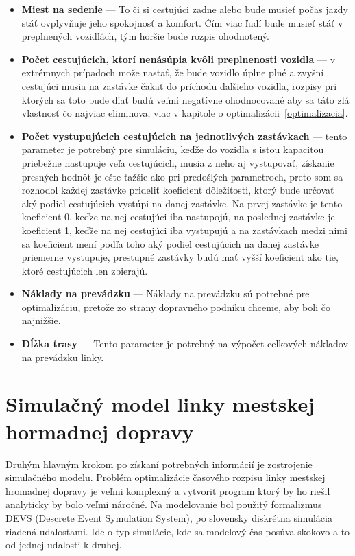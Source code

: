 \begin{itemize}
  \item \textbf{Miest na sedenie} --- To či si cestujúci zadne alebo bude musieť počas jazdy stáť ovplyvňuje jeho spokojnosť a komfort. Čím viac ľudí bude musieť stáť v preplnených vozidlách, tým horšie bude rozpis ohodnotený.
  \item \textbf{Počet cestujúcich, ktorí nenásúpia kvôli preplnenosti vozidla} --- v extrémnych prípadoch može nastať, že bude vozidlo úplne plné a zvyšní cestujúci musia na zastávke čakať do príchodu ďalšieho vozidla, rozpisy pri ktorých sa toto bude diať budú veľmi negatívne ohodnocované aby sa táto zlá vlastnosť čo najviac eliminova, viac v kapitole o optimalizácii~\ref{optimalizacia}.
  \item \textbf{Počet vystupujúcich cestujúcich na jednotlivých zastávkach} --- tento parameter je potrebný pre simuláciu, keďže do vozidla s istou kapacitou priebežne nastupuje veľa cestujúcich, musia z neho aj vystupovať, získanie presných hodnôt je ešte ťažšie ako pri predošlých parametroch, preto som sa rozhodol každej zastávke prideliť koeficient dôležitosti, ktorý bude určovať aký podiel cestujúcich vystúpi na danej zastávke. Na prvej zastávke je tento koeficient 0, keďze na nej cestujúci iba nastupojú, na poslednej zastávke je koeficient 1, keďže na nej cestujúci iba vystupujú a na zastávkach medzi nimi sa koeficient mení podľa toho aký podiel cestujúcich na danej zastávke priemerne vystupuje, prestupné zastávky budú mať vyšší koeficient ako tie, ktoré cestujúcich len zbierajú.
  \item \textbf{Náklady na prevádzku} --- Náklady na prevádzku sú potrebné pre optimalizáciu, pretože zo strany dopravného podniku chceme, aby boli čo najnižšie.
  \item \textbf{Dĺžka trasy} --- Tento parameter je potrebný na výpočet celkových nákladov na prevádzku linky.
\end{itemize}

\chapter{Simulačný model linky mestskej hormadnej dopravy}\label{simulacny_model}

Druhým hlavným krokom po získaní potrebných informácií je zostrojenie simulačného modelu.
Problém optimalizácie časového rozpisu linky mestskej hromadnej dopravy je veľmi komplexný a vytvoriť program ktorý by ho riešil analyticky by bolo veľmi náročné.
Na modelovanie bol použitý formalizmus DEVS (Descrete Event Symulation System), po slovensky diskrétna simulácia riadená udalosťami.
Ide o typ simulácie, kde sa modelový čas posúva skokovo a to od jednej udalosti k druhej.

